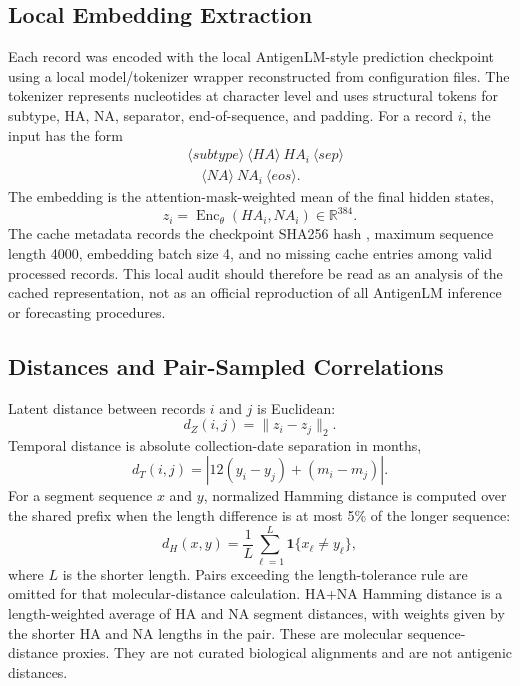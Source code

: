 \documentclass[11pt]{article}
\newcommand{\Enc}{\operatorname{Enc}}
\newcommand{\R}{\mathbb{R}}
\begin{document}
\subsection{Local Embedding Extraction}

Each record was encoded with the local AntigenLM-style prediction checkpoint  using a local model/tokenizer wrapper reconstructed from configuration files. The tokenizer represents nucleotides at character level and uses structural tokens for subtype, HA, NA, separator, end-of-sequence, and padding. For a record $i$, the input has the form
\[
\begin{aligned}
&\langle subtype\rangle \ \langle HA\rangle \ HA_i \ \langle sep\rangle \\
&\quad \langle NA\rangle \ NA_i \ \langle eos\rangle .
\end{aligned}
\]
The embedding is the attention-mask-weighted mean of the final hidden states,
\[
z_i=\Enc_{\theta}(HA_i,NA_i)\in\R^{384}.
\]
The cache metadata records the checkpoint SHA256 hash
, maximum sequence length 4000, embedding batch size 4, and no missing cache entries among valid processed records. This local audit should therefore be read as an analysis of the cached representation, not as an official reproduction of all AntigenLM inference or forecasting procedures.

\subsection{Distances and Pair-Sampled Correlations}

Latent distance between records $i$ and $j$ is Euclidean:
\[
d_Z(i,j)=\lVert z_i-z_j\rVert_2.
\]
Temporal distance is absolute collection-date separation in months,
\[
d_T(i,j)=\left|12(y_i-y_j)+(m_i-m_j)\right|.
\]
For a segment sequence $x$ and $y$, normalized Hamming distance is computed over the shared prefix when the length difference is at most 5\% of the longer sequence:
\[
d_H(x,y)=\frac{1}{L}\sum_{\ell=1}^{L}\mathbf{1}\{x_\ell\neq y_\ell\},
\]
where $L$ is the shorter length. Pairs exceeding the length-tolerance rule are omitted for that molecular-distance calculation. HA+NA Hamming distance is a length-weighted average of HA and NA segment distances, with weights given by the shorter HA and NA lengths in the pair. These are molecular sequence-distance proxies. They are not curated biological alignments and are not antigenic distances.
\end{document}
